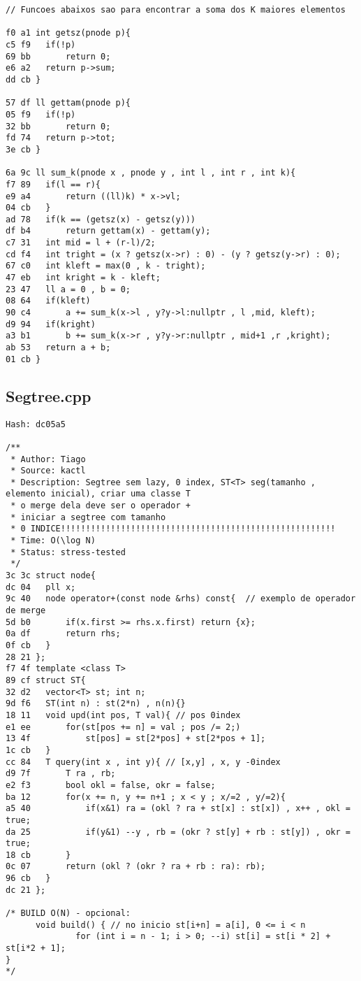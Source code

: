 \documentclass[11pt, a4paper, twoside]{article}
\begin{document}
\begin{lstlisting}
// Funcoes abaixos sao para encontrar a soma dos K maiores elementos

f0 a1 int getsz(pnode p){
c5 f9 	if(!p)
69 bb 		return 0;
e6 a2 	return p->sum;
dd cb }

57 df ll gettam(pnode p){
05 f9 	if(!p)
32 bb 		return 0;
fd 74 	return p->tot;
3e cb }

6a 9c ll sum_k(pnode x , pnode y , int l , int r , int k){
f7 89 	if(l == r){
e9 a4 		return ((ll)k) * x->vl;
04 cb 	}
ad 78 	if(k == (getsz(x) - getsz(y)))
df b4 		return gettam(x) - gettam(y);
c7 31 	int mid = l + (r-l)/2;
cd f4 	int tright = (x ? getsz(x->r) : 0) - (y ? getsz(y->r) : 0);
67 c0 	int kleft = max(0 , k - tright);
47 eb 	int kright = k - kleft;
23 47 	ll a = 0 , b = 0;
08 64 	if(kleft)
90 c4 		a += sum_k(x->l , y?y->l:nullptr , l ,mid, kleft);
d9 94 	if(kright)
a3 b1 		b += sum_k(x->r , y?y->r:nullptr , mid+1 ,r ,kright);
ab 53 	return a + b;
01 cb }
\end{lstlisting}

\subsection{Segtree.cpp}
\begin{lstlisting}
Hash: dc05a5

/**
 * Author: Tiago
 * Source: kactl
 * Description: Segtree sem lazy, 0 index, ST<T> seg(tamanho , elemento inicial), criar uma classe T 
 * o merge dela deve ser o operador +
 * iniciar a segtree com tamanho 
 * 0 INDICE!!!!!!!!!!!!!!!!!!!!!!!!!!!!!!!!!!!!!!!!!!!!!!!!!!!!!!!
 * Time: O(\log N)
 * Status: stress-tested
 */
3c 3c struct node{
dc 04 	pll x;
9c 40 	node operator+(const node &rhs) const{  // exemplo de operador de merge
5d b0 		if(x.first >= rhs.x.first) return {x};
0a df 		return rhs;
0f cb 	}
28 21 };
f7 4f template <class T>
89 cf struct ST{
32 d2 	vector<T> st; int n; 
9d f6 	ST(int n) : st(2*n) , n(n){}
18 11 	void upd(int pos, T val){ // pos 0index
e1 ee 		for(st[pos += n] = val ; pos /= 2;)
13 4f 			st[pos] = st[2*pos] + st[2*pos + 1];
1c cb 	}
cc 84 	T query(int x , int y){ // [x,y] , x, y -0index
d9 7f 		T ra , rb;
e2 f3 		bool okl = false, okr = false;
ba 12 		for(x += n, y += n+1 ; x < y ; x/=2 , y/=2){
a5 40 			if(x&1) ra = (okl ? ra + st[x] : st[x]) , x++ , okl = true;
da 25 			if(y&1) --y , rb = (okr ? st[y] + rb : st[y]) , okr = true;
18 cb 		}
0c 07 		return (okl ? (okr ? ra + rb : ra): rb);
96 cb 	}
dc 21 };

/* BUILD O(N) - opcional:
      void build() { // no inicio st[i+n] = a[i], 0 <= i < n
              for (int i = n - 1; i > 0; --i) st[i] = st[i * 2] + st[i*2 + 1];
}
*/
\end{lstlisting}
\end{document}
